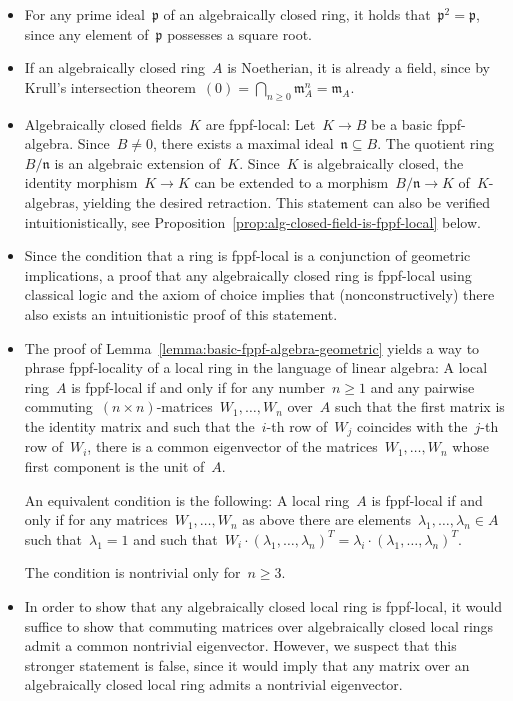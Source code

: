 \documentclass[10pt,reqno,a4paper]{amsbook}
\theoremstyle{definition}
\theoremstyle{plain}
\theoremstyle{remark}
\newcommand{\ppp}{\mathfrak{p}}
\newcommand{\mmm}{\mathfrak{m}}
\newcommand{\nnn}{\mathfrak{n}}
\newcommand{\?}{\,{:}\,}
\renewcommand{\_}{\mathpunct{.}\,}
\begin{document}
\begin{itemize}
\item For any prime ideal~$\ppp$ of an algebraically closed ring, it holds
that~$\ppp^2 = \ppp$, since any element of~$\ppp$ possesses a square root.
\item If an algebraically closed ring~$A$ is Noetherian, it is already a field,
since by Krull's intersection theorem~$(0) = \bigcap_{n \geq 0} \mmm_A^n =
\mmm_A$.
\item Algebraically closed fields~$K$ are fppf-local: Let~$K \to B$ be a basic
fppf-algebra. Since~$B \neq 0$, there exists a maximal ideal~$\nnn \subseteq
B$. The quotient ring~$B/\nnn$ is an algebraic extension of~$K$. Since~$K$ is
algebraically closed, the identity morphism~$K \to K$ can be extended to a
morphism~$B/\nnn \to K$ of~$K$-algebras, yielding the desired retraction.
This statement can also be verified intuitionistically, see
Proposition~\ref{prop:alg-closed-field-is-fppf-local} below.
\item Since the condition that a ring is fppf-local is a conjunction of
geometric implications, a proof that any algebraically closed ring is
fppf-local using classical logic and the axiom of choice implies that
(nonconstructively) there also exists an intuitionistic proof of this statement.
\item The proof of Lemma~\ref{lemma:basic-fppf-algebra-geometric} yields a way
to phrase fppf-locality of a local ring in the language of linear algebra:
A local ring~$A$ is fppf-local if and only if for any number~$n \geq 1$
and any pairwise commuting~$(n \times n)$-matrices~$W_1,\ldots,W_n$ over~$A$ such that
the first matrix is the identity matrix and such that the~$i$-th row of~$W_j$
coincides with the~$j$-th row of~$W_i$, there is a common eigenvector of
the matrices~$W_1,\ldots,W_n$ whose first component is the unit
of~$A$.\label{page:fppf-linear-algebra}

An equivalent condition is the following: A local ring~$A$ is fppf-local if and
only if for any matrices~$W_1,\ldots,W_n$ as above there are
elements~$\lambda_1,\ldots,\lambda_n \in A$ such that~$\lambda_1 = 1$ and such
that~$W_i \cdot (\lambda_1,\ldots,\lambda_n)^T = \lambda_i \cdot
(\lambda_1,\ldots,\lambda_n)^T$.

The condition is nontrivial only for~$n \geq 3$.

\item In order to show that any algebraically closed local ring is fppf-local,
it would suffice to show that commuting matrices over algebraically closed local
rings admit a common nontrivial eigenvector. However, we suspect that this
stronger statement is false, since it would imply that any matrix over an
algebraically closed local ring admits a nontrivial eigenvector.


\end{itemize}
\end{document}
